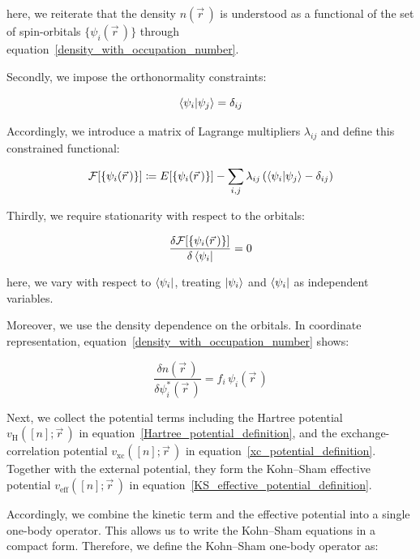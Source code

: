 here, we reiterate that the density $n(\vec{r}\,)$ is understood as a functional of the set of spin-orbitals $\{\psi_i(\vec{r}\,)\}$ through equation~\eqref{density_with_occupation_number}.

Secondly, we impose the orthonormality constraints:

\begin{equation}
    \braket{\psi_i|\psi_j}=\delta_{ij}
\label{KS_orbital_orthonormality}
\end{equation}

Accordingly, we introduce a matrix of Lagrange multipliers $\lambda_{ij}$ and define this constrained functional:

\begin{equation}
    \mathcal{F}[\{\psi_i(\vec{r}\,)\}]\coloneqq
    E[\{\psi_i(\vec{r}\,)\}]
    -\sum_{i,j}\lambda_{ij}\left(\braket{\psi_i|\psi_j}-\delta_{ij}\right)
\label{KS_constrained_functional_orbitals}
\end{equation}

Thirdly, we require stationarity with respect to the orbitals:

\begin{equation}
    \frac{\delta\mathcal{F}[\{\psi_i(\vec{r}\,)\}]}{\delta\bra{\psi_i}}=0
\label{KS_stationarity_condition_orbitals}
\end{equation}

here, we vary with respect to $\bra{\psi_i}$, treating $\ket{\psi_i}$ and $\bra{\psi_i}$ as independent variables.

Moreover, we use the density dependence on the orbitals.
In coordinate representation, equation~\eqref{density_with_occupation_number} shows:

\begin{equation}
    \frac{\delta n(\vec{r}\,)}{\delta \psi_i^\ast(\vec{r}\,)}
    =f_i\,\psi_i(\vec{r}\,)
\label{KS_density_orbital_derivative}
\end{equation}

Next, we collect the potential terms including
the Hartree potential $v_\mathrm{H}([n];\vec{r}\,)$ in equation~\eqref{Hartree_potential_definition},
and the exchange-correlation potential $v_\mathrm{xc}([n];\vec{r}\,)$ in equation~\eqref{xc_potential_definition}.
Together with the external potential, they form the Kohn--Sham effective potential $v_\mathrm{eff}([n];\vec{r}\,)$ in equation~\eqref{KS_effective_potential_definition}.

Accordingly, we combine the kinetic term and the effective potential into a single one-body operator.
This allows us to write the Kohn--Sham equations in a compact form.
Therefore, we define the Kohn--Sham one-body operator as:

